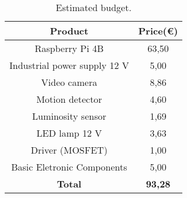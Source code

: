 \begin{table}[ht]
	\centering
	
	\begin{tabular}{||c | c||} 
		\hline
		\textbf{Product} & \textbf{Price(€)}\\
		\hline\hline
		Raspberry Pi 4B & 63,50\\\hline
		Industrial power supply 12 V & 5,00\\\hline
		Video camera & 8,86\\\hline
		Motion detector & 4,60\\\hline
		Luminosity sensor & 1,69\\\hline
		LED lamp 12 V & 3,63\\\hline
		Driver (MOSFET) & 1,00\\\hline
		Basic Eletronic Components & 5,00\\\hline
		\hline
		\textbf{Total} & \textbf{93,28}\\\hline
	\end{tabular}
	\caption{Estimated budget.}
	\label{table:data}
\end{table}